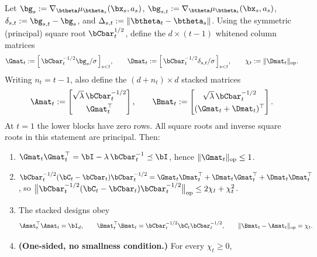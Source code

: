 \begin{lemma}\label{lem:whitened}
Let $\bg_s := \nabla_{\btheta}\mu_{\btheta_s}(\bx_s,a_s)$,
$\bg_{s,t}:=\nabla_{\btheta}\mu_{\btheta_t}(\bx_s,a_s)$,
$\delta_{s,t}:=\bg_{s,t}-\bg_s$, and
$\Delta_{s,t}:=\|\btheta_t-\btheta_s\|$.
Using the symmetric (principal) square root $\bCbar_t^{1/2}$, define the
$d\times(t{-}1)$ whitened column matrices
\begin{equation}\label{eq:whitened-cols}
  \Gmat_t := \Bigl[\,\bCbar_t^{-1/2}\bg_s/\sigma\,\Bigr]_{s<t},
  \qquad
  \Dmat_t := \Bigl[\,\bCbar_t^{-1/2}\delta_{s,t}/\sigma\,\Bigr]_{s<t},
  \qquad
  \chi_t := \|\Dmat_t\|_{\mathrm{op}} .
\end{equation}
Writing $n_t=t-1$, also define the $(d+n_t)\times d$ stacked matrices
\begin{equation}\label{eq:stacked-whitened-designs}
 \Amat_t:=\begin{bmatrix}
  \sqrt\lambda\,\bCbar_t^{-1/2}\\[1mm] \Gmat_t^\top
 \end{bmatrix},\qquad
 \Bmat_t:=\begin{bmatrix}
  \sqrt\lambda\,\bCbar_t^{-1/2}\\[1mm] (\Gmat_t+\Dmat_t)^\top
 \end{bmatrix}.
\end{equation}
At $t=1$ the lower blocks have zero rows.  All square roots and inverse
square roots in this statement are principal.
Then:
\begin{enumerate}[nosep,label=(\alph*),leftmargin=1.6em]
\item $\Gmat_t\Gmat_t^\top = \bI - \lambda\,\bCbar_t^{-1} \preceq \bI$,
  hence $\|\Gmat_t\|_{\mathrm{op}}\le 1$.
\item $\bCbar_t^{-1/2}(\bC_t-\bCbar_t)\bCbar_t^{-1/2}
  = \Gmat_t\Dmat_t^\top + \Dmat_t\Gmat_t^\top + \Dmat_t\Dmat_t^\top$,
  so $\bigl\|\bCbar_t^{-1/2}(\bC_t-\bCbar_t)\bCbar_t^{-1/2}\bigr\|_{\mathrm{op}}
  \le 2\chi_t + \chi_t^2$.
\item The stacked designs obey
  \begin{equation}\label{eq:stacked-identities}
   \Amat_t^\top\Amat_t=\bI_d,\qquad
   \Bmat_t^\top\Bmat_t=
   \bCbar_t^{-1/2}\bC_t\bCbar_t^{-1/2},\qquad
   \|\Bmat_t-\Amat_t\|_{\rm op}=\chi_t.
  \end{equation}
\item \textbf{(One-sided, no smallness condition.)} For every $\chi_t\ge0$,
  \begin{equation}\label{eq:onesided-C}

\end{equation}
\end{enumerate}
\end{lemma}
